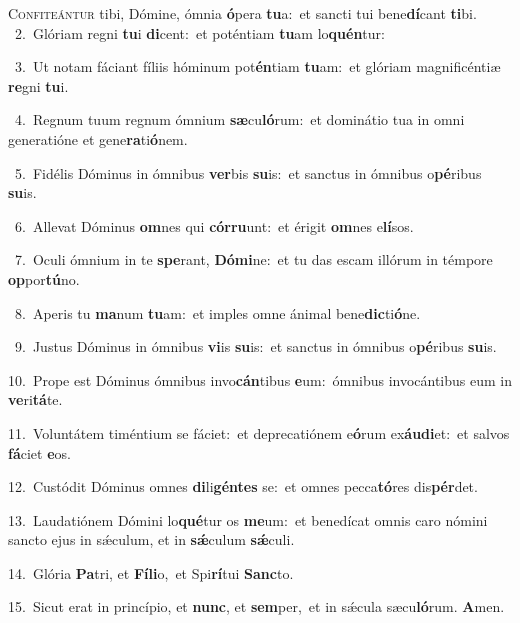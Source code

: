 \lettrine{\initial\textcolor{\initialcolor}{C}}{onfiteántur} tibi, Dómine, ómnia \textbf{ó}\-pera \textbf{tu}\-a:~\star et sancti tui bene\-\textbf{dí}\-cant \textbf{ti}\-bi.\\
{\numbfont\textcolor{\numbcolor}{~2.}}~Glóriam regni \textbf{tu}\-i \textbf{di}\-cent:~\star et poténtiam \textbf{tu}\-am lo\-\textbf{quén}\-tur:\par
{\numbfont\textcolor{\numbcolor}{~3.}}~Ut notam fáciant fíliis hóminum pot\-\textbf{én}\-tiam \textbf{tu}\-am:~\star et glóriam magnificéntiæ \textbf{re}\-gni \textbf{tu}\-i.\par
{\numbfont\textcolor{\numbcolor}{~4.}}~Regnum tuum regnum ómnium \textbf{sæ}\-cu\-\textbf{ló}\-rum:~\star et dominátio tua in omni generatióne et gene\-\textbf{ra}\-ti\-\textbf{ó}\-nem.\par
{\numbfont\textcolor{\numbcolor}{~5.}}~Fidélis Dóminus in ómnibus \textbf{ver}\-bis \textbf{su}\-is:~\star et sanctus in ómnibus o\-\textbf{pé}\-ribus \textbf{su}\-is.\par
{\numbfont\textcolor{\numbcolor}{~6.}}~Allevat Dóminus \textbf{om}\-nes qui \textbf{cór}\-\textbf{ru}unt:~\star et érigit \textbf{om}\-nes e\-\textbf{lí}\-sos.\par
{\numbfont\textcolor{\numbcolor}{~7.}}~Oculi ómnium in te \textbf{spe}\-rant, \textbf{Dó}\-\textbf{mi}ne:~\star et tu das escam illórum in témpore \textbf{op}\-por\-\textbf{tú}\-no.\par
{\numbfont\textcolor{\numbcolor}{~8.}}~Aperis tu \textbf{ma}\-num \textbf{tu}\-am:~\star et imples omne ánimal bene\-\textbf{dic}\-ti\-\textbf{ó}\-ne.\par
{\numbfont\textcolor{\numbcolor}{~9.}}~Justus Dóminus in ómnibus \textbf{vi}\-is \textbf{su}\-is:~\star et sanctus in ómnibus o\-\textbf{pé}\-ribus \textbf{su}\-is.\par
{\numbfont\textcolor{\numbcolor}{10.}}~Prope est Dóminus ómnibus invo\-\textbf{cán}\-tibus \textbf{e}\-um:~\star ómnibus invocántibus eum in \textbf{ve}\-ri\-\textbf{tá}\-te.\par
{\numbfont\textcolor{\numbcolor}{11.}}~Voluntátem timéntium se fáciet:~\dagger et deprecatiónem e\-\textbf{ó}\-rum ex\-\textbf{áu}\-\textbf{di}et:~\star et salvos \textbf{fá}\-ciet \textbf{e}\-os.\par
{\numbfont\textcolor{\numbcolor}{12.}}~Custódit Dóminus omnes \textbf{di}\-li\-\textbf{gén}\-\textbf{tes} se:~\star et omnes pecca\-\textbf{tó}\-res dis\-\textbf{pér}\-det.\par
{\numbfont\textcolor{\numbcolor}{13.}}~Laudatiónem Dómini lo\-\textbf{qué}\-tur os \textbf{me}\-um:~\star et benedícat omnis caro nómini sancto ejus in sǽculum, et in \textbf{sǽ}\-culum \textbf{sǽ}\-culi.\par
{\numbfont\textcolor{\numbcolor}{14.}}~Glória \textbf{Pa}\-tri, et \textbf{Fí}\-\textbf{li}o,~\star et Spi\-\textbf{rí}\-tui \textbf{Sanc}\-to.\par
{\numbfont\textcolor{\numbcolor}{15.}}~Sicut erat in princípio, et \textbf{nunc}\-, et \textbf{sem}\-per,~\star et in sǽcula sæcu\-\textbf{ló}\-rum. \textbf{A}\-men.\par
